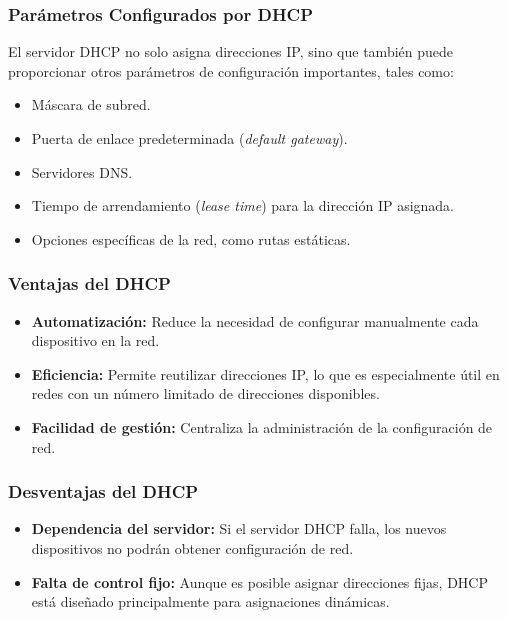 \documentclass[a4paper,12pt]{article}
\begin{document}
\subsubsection*{Parámetros Configurados por DHCP}

El servidor DHCP no solo asigna direcciones IP, sino que también puede proporcionar otros parámetros de configuración importantes, tales como:
\begin{itemize}
    \item Máscara de subred.
    \item Puerta de enlace predeterminada (\textit{default gateway}).
    \item Servidores DNS.
    \item Tiempo de arrendamiento (\textit{lease time}) para la dirección IP asignada.
    \item Opciones específicas de la red, como rutas estáticas.
\end{itemize}

\subsubsection*{Ventajas del DHCP}

\begin{itemize}
    \item \textbf{Automatización:} Reduce la necesidad de configurar manualmente cada dispositivo en la red.
    \item \textbf{Eficiencia:} Permite reutilizar direcciones IP, lo que es especialmente útil en redes con un número limitado de direcciones disponibles.
    \item \textbf{Facilidad de gestión:} Centraliza la administración de la configuración de red.
\end{itemize}

\subsubsection*{Desventajas del DHCP}

\begin{itemize}
    \item \textbf{Dependencia del servidor:} Si el servidor DHCP falla, los nuevos dispositivos no podrán obtener configuración de red.
    \item \textbf{Falta de control fijo:} Aunque es posible asignar direcciones fijas, DHCP está diseñado principalmente para asignaciones dinámicas.
\end{itemize}
\end{document}
